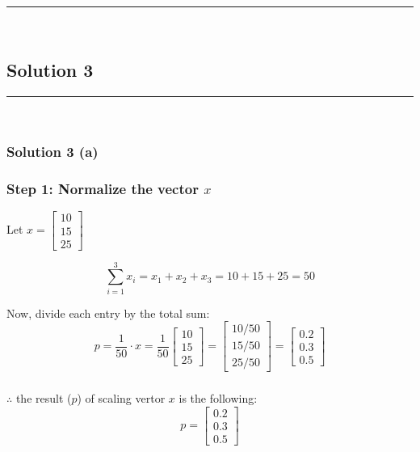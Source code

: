 \documentclass{article}
\begin{document}
\noindent\rule{\textwidth}{0.4pt}\\

\newpage

\subsection*{Solution 3}
\noindent\rule{\textwidth}{0.4pt}\\
\subsubsection*{Solution 3 (a)}
\subsubsection*{Step 1: Normalize the vector $x$}
\parbox{\textwidth}{
Let $x = \begin{bmatrix} 10 \\ 15 \\ 25 \end{bmatrix}$

$$\sum_{i=1}^{3} x_{i} = x_{1} + x_{2} + x_{3} = 10 + 15 + 25 = 50$$

Now, divide each entry by the total sum:\\

$$p = \frac{1}{50} \cdot x = \frac{1}{50} \begin{bmatrix} 10 \\ 15 \\ 25 \end{bmatrix} = \begin{bmatrix} 10/50 \\ 15/50 \\ 25/50 \end{bmatrix} = \begin{bmatrix} 0.2 \\ 0.3 \\ 0.5 \end{bmatrix}$$
}
\subsubsection*{\normalfont}{$\therefore$ the result ($p$) of scaling vertor $x$ is the following:}
$$p = \begin{bmatrix} 0.2 \\ 0.3 \\ 0.5 \end{bmatrix}$$ \\
\end{document}
